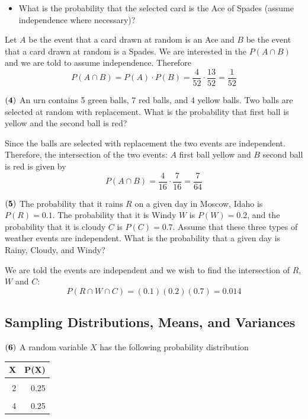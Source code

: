 \documentclass[
]{article}
\providecommand{\tightlist}{%
  \setlength{\itemsep}{0pt}\setlength{\parskip}{0pt}}
\begin{document}
\begin{itemize}
\tightlist
\item
  What is the probability that the selected card is the Ace of Spades
  (assume independence where necessary)?
\end{itemize}

{Let \(A\) be the event that a card drawn at random is an Ace and \(B\)
be the event that a card drawn at random is a Spades. We are interested
in the \(P(A\cap B)\) and we are told to assume independence. Therefore
\[P(A\cap B) = P(A)\cdot P(B) = \frac{4}{52} \cdot \frac{13}{52} = \frac{1}{52}\]}

\(\bf (4)\) An urn contains 5 green balls, 7 red balls, and 4 yellow
balls. Two balls are selected at random with replacement. What is the
probability that first ball is yellow and the second ball is red?

{Since the balls are selected with replacement the two events are
independent. Therefore, the intersection of the two events: \(A\) first
ball yellow and \(B\) second ball is red is given by
\[P(A\cap B) = \frac{4}{16} \cdot \frac{7}{16}  = \frac{7}{64}\]}

\(\bf (5)\) The probability that it rains \(R\) on a given day in
Moscow, Idaho is \(P(R) = 0.1\). The probability that it is Windy \(W\)
is \(P(W) = 0.2\), and the probability that it is cloudy \(C\) is
\(P(C) = 0.7\). Assume that these three types of weather events are
independent. What is the probability that a given day is Rainy, Cloudy,
and Windy?

{We are told the events are independent and we wish to find the
intersection of \(R\), \(W\) and \(C\):
\[P(R\cap W\cap C) = (0.1)(0.2)(0.7) = 0.014 \]}

\subsection{Sampling Distributions, Means, and
Variances}\label{sampling-distributions-means-and-variances}

\(\bf (6)\) A random variable \(X\) has the following probability
distribution

\begin{table}[H]
\centering\centering
\begin{tabular}{rr}
\toprule
X & P(X)\\
\midrule
\cellcolor{gray!10}{1} & \cellcolor{gray!10}{0.25}\\
2 & 0.25\\
\cellcolor{gray!10}{3} & \cellcolor{gray!10}{0.25}\\
4 & 0.25\\
\bottomrule
\end{tabular}
\end{table}
\end{document}
